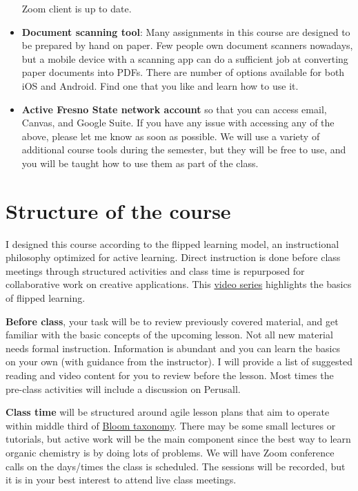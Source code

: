 \begin{itemize}
  Zoom client is up to date.
\item
  \textbf{Document scanning tool}: Many assignments in this course are
  designed to be prepared by hand on paper. Few people own document
  scanners nowadays, but a mobile device with a scanning app can do a
  sufficient job at converting paper documents into PDFs. There are
  number of options available for both iOS and Android. Find one that
  you like and learn how to use it.
\item
  \textbf{Active Fresno State network account} so that you can access
  email, Canvas, and Google Suite. If you have any issue with accessing
  any of the above, please let me know as soon as possible. We will use
  a variety of additional course tools during the semester, but they
  will be free to use, and you will be taught how to use them as part of
  the class.
\end{itemize}

\hypertarget{structure-of-the-course}{%
\section{Structure of the course}\label{structure-of-the-course}}

I designed this course according to the flipped learning model, an
instructional philosophy optimized for active learning. Direct
instruction is done before class meetings through structured activities
and class time is repurposed for collaborative work on creative
applications. This \href{https://vimeo.com/showcase/8484250}{video
series} highlights the basics of flipped learning.

\textbf{Before class}, your task will be to review previously covered
material, and get familiar with the basic concepts of the upcoming
lesson. Not all new material needs formal instruction. Information is
abundant and you can learn the basics on your own (with guidance from
the instructor). I will provide a list of suggested reading and video
content for you to review before the lesson. Most times the pre-class
activities will include a discussion on Perusall.

\textbf{Class time} will be structured around agile lesson plans that
aim to operate within middle third of
\href{https://flic.kr/p/LQuqT2}{Bloom taxonomy}. There may be some small
lectures or tutorials, but active work will be the main component since
the best way to learn organic chemistry is by doing lots of problems. We
will have Zoom conference calls on the days/times the class is
scheduled. The sessions will be recorded, but it is in your best
interest to attend live class meetings.


